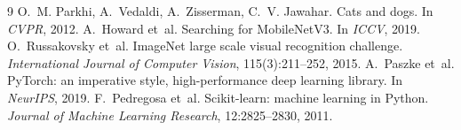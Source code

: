 \documentclass[11pt,a4paper]{article}
\begin{document}
\begin{thebibliography}{9}
 O.~M. Parkhi, A.~Vedaldi, A.~Zisserman, C.~V. Jawahar.
\newblock Cats and dogs. \newblock In \emph{CVPR}, 2012.
 A.~Howard et~al.
\newblock Searching for MobileNetV3. \newblock In \emph{ICCV}, 2019.
 O.~Russakovsky et~al.
\newblock ImageNet large scale visual recognition challenge.
\newblock \emph{International Journal of Computer Vision}, 115(3):211--252, 2015.
 A.~Paszke et~al.
\newblock PyTorch: an imperative style, high-performance deep learning library.
\newblock In \emph{NeurIPS}, 2019.
 F.~Pedregosa et~al.
\newblock Scikit-learn: machine learning in Python.
\newblock \emph{Journal of Machine Learning Research}, 12:2825--2830, 2011.
\end{thebibliography}
\end{document}
